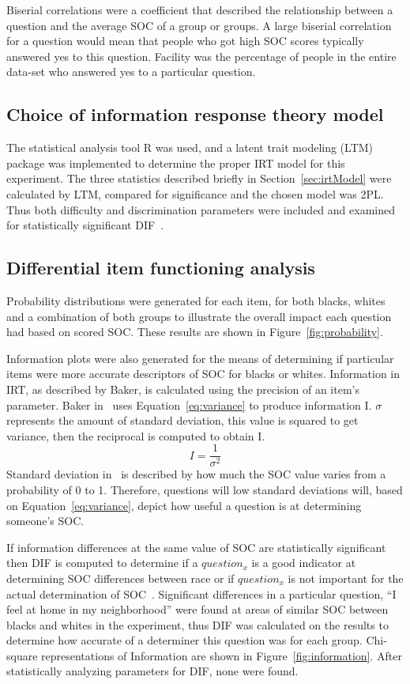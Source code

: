 \documentclass{sig-alternate}
\begin{document}
Biserial correlations were a coefficient that described the relationship between a question and the average SOC of a group or groups. A large biserial correlation for a question would mean that people who got high SOC scores typically answered yes to this question. Facility was the percentage of people in the entire data-set who answered yes to a particular question.

\subsection{Choice of information response theory model}
The statistical analysis tool R was used, and a latent trait modeling (LTM) package was implemented to determine the proper IRT model for this experiment. The three statistics described briefly in Section~\ref{sec:irtModel} were calculated by LTM, compared for significance and the chosen model was 2PL. Thus both difficulty and discrimination parameters were included and examined for statistically significant DIF~\cite{disparities:2009}.

\subsection{Differential item functioning analysis}
Probability distributions were generated for each item, for both blacks, whites and a combination of both groups to illustrate the overall impact each question had based on scored SOC. These results are shown in Figure~\ref{fig:probability}.


Information plots were also generated for the means of determining if particular items were more accurate descriptors of SOC for blacks or whites. Information in IRT, as described by Baker, is calculated using the precision of an item's parameter. Baker in~\cite{irt:2001} uses Equation~\ref{eq:variance} to produce information I. $\sigma$ represents the amount of standard deviation, this value is squared to get variance, then the reciprocal is computed to obtain I.
\begin{equation}
\label{eq:variance}
I =  \frac{1}{  \sigma ^{2} } 
\end{equation}
Standard deviation in~\cite{disparities:2009} is described by how much the SOC value varies from a probability of 0 to 1. Therefore, questions will low standard deviations will, based on Equation~\ref{eq:variance}, depict how useful a question is at determining someone's SOC. 

If information differences at the same value of SOC are statistically significant then DIF is computed to determine if a $question_x$ is a good indicator at determining SOC differences between race or if $question_x$ is not important for the actual determination of SOC~\cite{disparities:2009}.
Significant differences in a particular question, ``I feel at home in my neighborhood'' were found at areas of similar SOC between blacks and whites in the experiment, thus DIF was calculated on the results to determine how accurate of a determiner this question was for each group. Chi-square representations of Information are shown in Figure~\ref{fig:information}. After statistically analyzing parameters for DIF, none were found.
\end{document}
